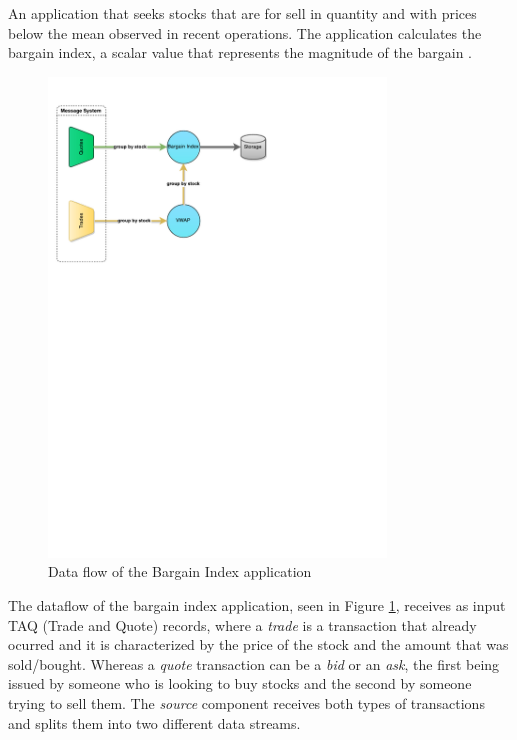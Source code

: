 \documentclass[ppgc,diss,english]{iiufrgs}
\begin{document}
An application that seeks stocks that are for sell in quantity and with prices below the mean observed in recent operations. The application calculates the bargain index, a scalar value that represents the magnitude of the bargain \cite{gedik2008spade, andrade2009scale, dayarathna2013automatic}.


\begin{figure}[!ht]
	\centering
	\includegraphics[width=0.8\textwidth]{images/apps/BargainIndex.pdf}
	\caption{Data flow of the Bargain Index application}
	\label{fig:app_bargain_index}
\end{figure}

The dataflow of the bargain index application, seen in Figure \ref{fig:app_bargain_index}, receives as input TAQ (Trade and Quote) records, where a \emph{trade} is a transaction that already ocurred and it is characterized by the price of the stock and the amount that was sold/bought. Whereas a \emph{quote} transaction can be a \emph{bid} or an \emph{ask}, the first being issued by someone who is looking to buy stocks and the second by someone trying to sell them. The \emph{source} component receives both types of transactions and splits them into two different data streams.
\end{document}
